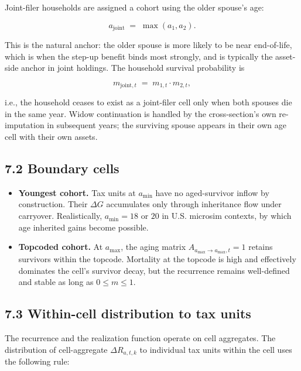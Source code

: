 \documentclass[11pt]{article}
\begin{document}
Joint-filer households are assigned a cohort using the older spouse's age:

\[
a_{\text{joint}} \;=\; \max(a_1, a_2).
\]

This is the natural anchor: the older spouse is more likely to be near end-of-life, which is when the step-up benefit binds most strongly, and is typically the asset-side anchor in joint holdings. The household survival probability is

\[
m_{\text{joint}, t} \;=\; m_{1, t} \cdot m_{2, t},
\]

i.e., the household ceases to exist as a joint-filer cell only when both spouses die in the same year. Widow continuation is handled by the cross-section's own re-imputation in subsequent years; the surviving spouse appears in their own age cell with their own assets.

\subsection*{7.2 Boundary cells}

\begin{itemize}
  \item \textbf{Youngest cohort.} Tax units at $a_{\min}$ have no aged-survivor inflow
    by construction. Their $\Delta G$ accumulates only through inheritance
    flow under carryover. Realistically, $a_{\min} = 18$ or $20$ in U.S.
    microsim contexts, by which age inherited gains become possible.
\end{itemize}
\begin{itemize}
  \item \textbf{Topcoded cohort.} At $a_{\max}$, the aging matrix $A_{a_{\max} \to
  a_{\max}, t} = 1$ retains survivors within the topcode. Mortality at the
    topcode is high and effectively dominates the cell's survivor decay, but
    the recurrence remains well-defined and stable as long as $0 \leq m \leq
  1$.
\end{itemize}

\subsection*{7.3 Within-cell distribution to tax units}

The recurrence and the realization function operate on cell aggregates. The distribution of cell-aggregate $\Delta R_{a, t, k}$ to individual tax units within the cell uses the following rule:
\end{document}
